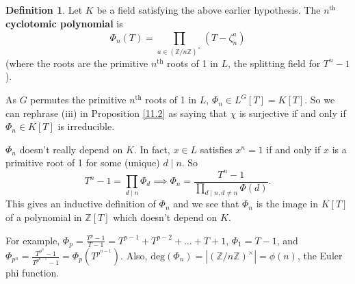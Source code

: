 \documentclass{article}
\theoremstyle{definition}
\newtheorem{defn}{Definition}[section]
\begin{document}
\begin{defn}
    Let $K$ be a field satisfying the above earlier hypothesis. The $n^{\text{th}}$ \textbf{cyclotomic polynomial} is $$\Phi_n(T)=\prod_{a \in (\mathbb{Z}/n\mathbb{Z})^\times}^{} (T-\zeta_n^a)$$ (where the roots are the primitive $n^{\text{th}}$ roots of 1 in $L$, the splitting field for $T^n-1$). 
\end{defn}
As $G$ permutes the primitive $n^{\text{th}}$ roots of 1 in $L$, $\Phi_n \in L^G[T] = K[T]$. So we can rephrase (iii) in Proposition \ref{11.2} as saying that $\chi$ is surjective if and only if $\Phi_n \in K[T]$ is irreducible.
\vspace{1mm}

$\Phi_n$ doesn't really depend on $K$. In fact, $x \in L$ satisfies $x^n=1$ if and only if $x$ is a primitive root of 1 for some (unique) $d \mid n$. So $$T^n-1 = \prod_{d \mid n}^{} \Phi_d \implies \Phi_n = \frac{T^n-1}{\prod_{d \mid n, d\neq n}^{} \Phi(d)}.$$
This gives an inductive definition of $\Phi_n$ and we see that $\Phi_n$ is the image in $K[T]$ of a polynomial in $\mathbb{Z}[T]$ which doesn't depend on $K$.

For example, $\Phi_p = \frac{T^p-1}{T-1}=T^{p-1}+T^{p-2}+\ldots+T+1$, $\Phi_1 = T-1$, and $\Phi_{p^n} = \frac{T^{p^n}-1}{T^{p^{n-1}}-1} = \Phi_p(T^{p^{n-1}})$. Also, $\text{deg}(\Phi_n) = |(\mathbb{Z}/n\mathbb{Z})^\times|=\phi(n)$, the Euler phi function.
\vspace{1mm}
\end{document}
